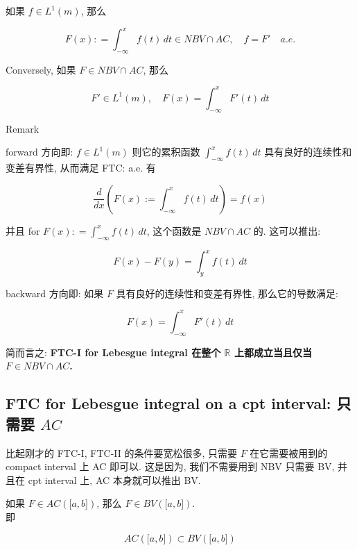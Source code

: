 \documentclass{qlnotes-export}
\begin{document}
\begin{corollary}\label{cor-12-differentiation-on-real-spaces-corollary-002}

如果 \(f \in L^{1}(m)\), 那么

\[F(x): = \int_{- \infty}^{x}f(t)\, dt \in NBV \cap AC,\quad f = F'\quad a.e.\]

Conversely, 如果 \(F \in NBV \cap AC\), 那么

\[F' \in L^{1}(m),\quad F(x) = \int_{- \infty}^{x}F'(t)\, dt\]

\end{corollary}

\begin{qlremark}{Remark}

forward 方向即: \(f \in L^{1}(m)\) 则它的累积函数 \(\int_{- \infty}^{x}f(t)\, dt\) 具有良好的连续性和变差有界性, 从而满足 FTC: a.e. 有

\[\frac{d}{dx}(F(x) := \int_{- \infty}^{x}f(t)\, dt) = f(x)\]

并且 for \(F(x): = \int_{- \infty}^{x}f(t)\, dt\), 这个函数是 \(NBV \cap AC\) 的. 这可以推出:

\[F(x) - F(y) = \int_{y}^{x}f(t)\, dt\]

backward 方向即: 如果 \(F\) 具有良好的连续性和变差有界性, 那么它的导数满足:

\[F(x) = \int_{- \infty}^{x}F'(t)\, dt\]

简而言之: \textbf{FTC-I for Lebesgue integral 在整个 \(\mathbb{R}\) 上都成立当且仅当 \(F \in NBV \cap AC\).}

\end{qlremark}

\subsection{\texorpdfstring{FTC for Lebesgue integral on a cpt interval: 只需要 \(AC\)}{FTC for Lebesgue integral on a cpt interval: 只需要 AC}}\label{ftc-for-lebesgue-integral-on-a-cpt-interval-ux53eaux9700ux8981-ac}

比起刚才的 FTC-I, FTC-II 的条件要宽松很多, 只需要 \(F\) 在它需要被用到的 compact interval 上 AC 即可以. 这是因为, 我们不需要用到 NBV 只需要 BV, 并且在 cpt interval 上, AC 本身就可以推出 BV.

\begin{lemma}\label{lem-12-differentiation-on-real-spaces-lemma-009}

如果 \(F \in AC(\lbrack a,b\rbrack)\), 那么 \(F \in BV(\lbrack a,b\rbrack)\).\\
即

\[AC(\lbrack a,b\rbrack) \subset BV(\lbrack a,b\rbrack)\]

\end{lemma}
\end{document}
